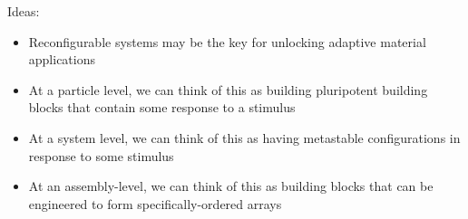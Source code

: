 Ideas:
\begin{itemize}
\item Reconfigurable systems may be the key for unlocking adaptive material applications
\item At a particle level, we can think of this as building pluripotent building blocks that contain some response to a stimulus
\item At a system level, we can think of this as having metastable configurations in response to some stimulus
\item At an assembly-level, we can think of this as building blocks that can be engineered to form specifically-ordered arrays
\end{itemize}
